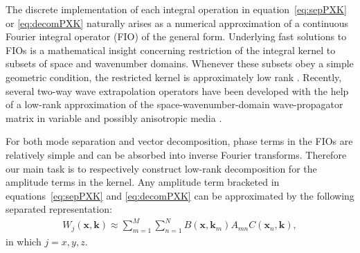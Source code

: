 The discrete implementation of each integral operation in equation~\ref{eq:sepPXK} or \ref{eq:decomPXK} naturally arises as a numerical approximation of a continuous Fourier
integral operator (FIO) of the general form. 
Underlying fast solutions to FIOs is a mathematical insight concerning restriction of the integral kernel to subsets of space and wavenumber domains.
Whenever these subsets obey a simple geometric condition, the restricted kernel is approximately low rank \cite[]{candes:2007,ying:2012}.
Recently, several two-way wave extrapolation operators have been developed with the help of a low-rank approximation of the space-wavenumber-domain wave-propagator
matrix in variable and possibly anisotropic media \cite[]{fomel:2010,fomel:2013,song:2011,song:2013b,alkhalifah:2013}.

For both mode separation and vector decomposition, phase terms in the FIOs are relatively simple and can be absorbed into inverse Fourier transforms. 
Therefore our main task is to respectively construct low-rank decomposition for the amplitude terms in the kernel. 
 Any amplitude term bracketed in equations~\ref{eq:sepPXK} and \ref{eq:decomPXK} can be approximated by the following separated representation:
\begin{eqnarray}
\label{eq:lowrank}
W_{j}(\mathbf{x},\mathbf{k})\approx
        \sum_{m=1}^M \sum_{n=1}^N B(\mathbf{x},\mathbf{k}_{m})A_{mn}C(\mathbf{x}_{n},\mathbf{k}),
\end{eqnarray}
in which $j=x, y, z$.
